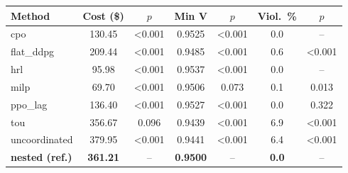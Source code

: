 \begin{tabular}{lcccccc}
\toprule
Method & Cost (\$) & $p$ & Min V & $p$ & Viol.\ \% & $p$ \\
\midrule
cpo & 130.45 & <0.001 & 0.9525 & <0.001 & 0.0 & -- \\
flat_ddpg & 209.44 & <0.001 & 0.9485 & <0.001 & 0.6 & <0.001 \\
hrl & 95.98 & <0.001 & 0.9537 & <0.001 & 0.0 & -- \\
milp & 69.70 & <0.001 & 0.9506 & 0.073 & 0.1 & 0.013 \\
ppo_lag & 136.40 & <0.001 & 0.9527 & <0.001 & 0.0 & 0.322 \\
tou & 356.67 & 0.096 & 0.9439 & <0.001 & 6.9 & <0.001 \\
uncoordinated & 379.95 & <0.001 & 0.9441 & <0.001 & 6.4 & <0.001 \\
\textbf{nested (ref.)} & \textbf{361.21} & -- & \textbf{0.9500} & -- & \textbf{0.0} & -- \\
\bottomrule
\end{tabular}
